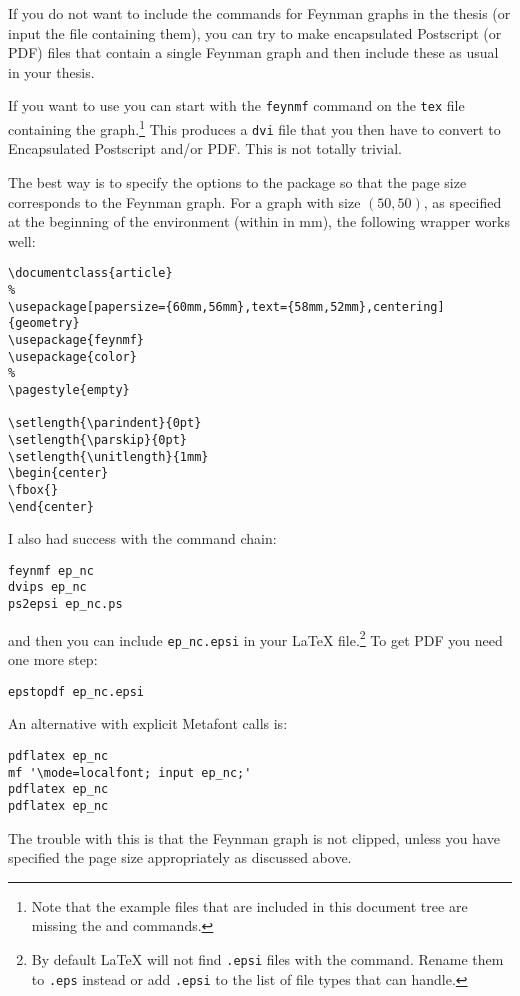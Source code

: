 If you do not want to include the  commands for Feynman
graphs in the thesis (or input the file containing them), you can try
to make encapsulated Postscript (or PDF) files that contain a single
Feynman graph and then include these as usual in your thesis.

If you want to use  you can start with the
\texttt{feynmf} command on the \texttt{tex} file containing the
graph.\footnote{Note that the example files that are included in this
  document tree are missing the  and
   commands.}  This produces a \texttt{dvi} file
that you then have to convert to Encapsulated Postscript and/or
PDF\@. This is not totally trivial.

The best way is to specify the options to the 
package so that the page size corresponds to the Feynman graph. For a
graph with size $(50,50)$, as specified at the beginning of the
 environment (within  in \si{\mm}), the
following wrapper works well:
\begin{verbatim}
\documentclass{article}
%
\usepackage[papersize={60mm,56mm},text={58mm,52mm},centering]{geometry}
\usepackage{feynmf}
\usepackage{color}
%
\pagestyle{empty}

\setlength{\parindent}{0pt}
\setlength{\parskip}{0pt}
\setlength{\unitlength}{1mm}
\begin{center}
\fbox{}
\end{center}

\end{verbatim}

I also had success with the command chain:
\begin{verbatim}
feynmf ep_nc
dvips ep_nc
ps2epsi ep_nc.ps
\end{verbatim}
and then you can include \texttt{ep\_nc.epsi} in your \LaTeX
file.\footnote{By default \LaTeX{} will not find \texttt{.epsi} files
  with the  command. Rename them to
  \texttt{.eps} instead or add \texttt{.epsi} to the list of file
  types that  can handle.} To
get PDF you need one more step:
\begin{verbatim}
epstopdf ep_nc.epsi
\end{verbatim}

An alternative with explicit Metafont calls is:
\begin{verbatim}
pdflatex ep_nc
mf '\mode=localfont; input ep_nc;'
pdflatex ep_nc
pdflatex ep_nc
\end{verbatim}
The trouble with this is that the Feynman graph is not clipped, unless
you have specified the page size appropriately as discussed above.


